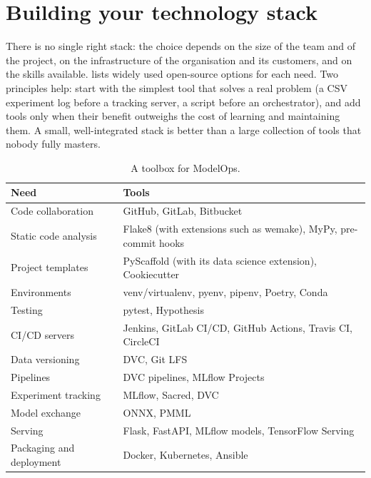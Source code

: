 \section{Building your technology stack}\label{sec:stack}

There is no single right stack: the choice depends on the size of the team and of the project, on the
infrastructure of the organisation and its customers, and on the skills available.  lists
widely used open-source options for each need. Two principles help: start with the simplest tool that solves
a real problem (a CSV experiment log before a tracking server, a script before an orchestrator), and add
tools only when their benefit outweighs the cost of learning and maintaining them. A small, well-integrated
stack is better than a large collection of tools that nobody fully masters.

\begin{table}[htbp]
\centering\small
\caption{A toolbox for ModelOps.}\label{tab:stack}
\begin{tabularx}{\textwidth}{@{}>{\raggedright\arraybackslash}p{3.4cm}X@{}}
\toprule
Need & Tools\\
\midrule
Code collaboration & GitHub, GitLab, Bitbucket\\
Static code analysis & Flake8 (with extensions such as wemake), MyPy, pre-commit hooks\\
Project templates & PyScaffold (with its data science extension), Cookiecutter\\
Environments & venv/virtualenv, pyenv, pipenv, Poetry, Conda\\
Testing & pytest, Hypothesis\\
CI/CD servers & Jenkins, GitLab CI/CD, GitHub Actions, Travis CI, CircleCI\\
Data versioning & DVC, Git LFS\\
Pipelines & DVC pipelines, MLflow Projects\\
Experiment tracking & MLflow, Sacred, DVC\\
Model exchange & ONNX, PMML\\
Serving & Flask, FastAPI, MLflow models, TensorFlow Serving \citep{olston2017tensorflow}\\
Packaging and deployment & Docker, Kubernetes, Ansible\\
\bottomrule
\end{tabularx}
\end{table}

